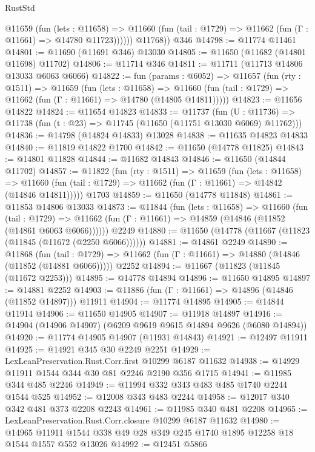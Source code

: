 \begin{lexlean}{RustStd}
\begin{coremodule}
            @11659
              (fun (lets : @11658) =>
              @11660 (fun (tail : @1729) => @11662 (fun (Γ : @11661) => @14780 @11723))))))
        @11768))
    @346
@14798 := @11774 @11461
@14801 := @11690 (@11691 @346) @13030
@14805 := @11650 (@11682 (@14801 @11698) @11702)
@14806 := @11714 @346
@14811 := @11711 (@11713 @14806 @13033 @6063 @6066)
@14822 := fun (params : @6052) =>
  @11657
    (fun (rty : @1511) =>
    @11659
      (fun (lets : @11658) =>
      @11660 (fun (tail : @1729) => @11662 (fun (Γ : @11661) => @14780 (@14805 @14811)))))
@14823 := @11656 @14822
@14824 := @11654 @14823
@14833 := @11737
    (fun (U : @11736) => @11738 (fun (t : @23) => @11745 (@11650 (@11751 @13030 @6069) @11762)))
@14836 := @14798 (@14824 @14833) @13028
@14838 := @11635 @14823 @14833
@14840 := @11819 @14822 @1700
@14842 := @11650 (@14778 @11825)
@14843 := @14801 @11828
@14844 := @11682 @14843
@14846 := @11650 (@14844 @11702)
@14857 := @11822
    (fun (rty : @1511) =>
    @11659
      (fun (lets : @11658) =>
      @11660 (fun (tail : @1729) => @11662 (fun (Γ : @11661) => @14842 (@14846 @14811)))))
    @1703
@14859 := @11650 (@14778 @11848)
@14861 := @11853 @14806 @13033
@14873 := @11844
    (fun (lets : @11658) =>
    @11660
      (fun (tail : @1729) =>
      @11662 (fun (Γ : @11661) => @14859 (@14846 (@11852 (@14861 @6063 @6066))))))
    @2249
@14880 := @11650 (@14778 (@11667 (@11823 (@11845 (@11672 (@2250 @6066))))))
@14881 := @14861 @2249
@14890 := @11868
    (fun (tail : @1729) => @11662 (fun (Γ : @11661) => @14880 (@14846 (@11852 (@14881 @6066)))))
    @2252
@14894 := @11667 (@11823 (@11845 (@11672 @2253)))
@14895 := @14778 @14894
@14896 := @11650 @14895
@14897 := @14881 @2252
@14903 := @11886 (fun (Γ : @11661) => @14896 (@14846 (@11852 @14897))) @11911
@14904 := @11774 @14895
@14905 := @14844 @11914
@14906 := @11650 @14905
@14907 := @11918 @14897
@14916 := @14904 (@14906 @14907) (@6209 @9619 @9615 @14894 @9626 (@6080 @14894))
@14920 := @11774 @14905 @14907 (@11931 @14843)
@14921 := @12497 @11911
@14925 := @14921 @345 @30 @2249 @2251
@14929 := LexLeanPreservation.Rust.Corr.first @10299 @6187 @11632
@14938 := @14929 @11911 @1544 @344 @30 @81 @2246 @2190 @356 @1715
@14941 := @11985 @344 @485 @2246
@14949 := @11994 @332 @343 @483 @485 @1740 @2244 @1544 @525
@14952 := @12008 @343 @483 @2244
@14958 := @12017 @340 @342 @481 @373 @2208 @2243
@14961 := @11985 @340 @481 @2208
@14965 := LexLeanPreservation.Rust.Corr.closure @10299 @6187 @11632
@14980 := @14965 @11911 @1544 @338 @49 @28 @349 @245 @1740 @1895 @12258 @18 @1544 @1557 @552 @13026
@14992 := @12451
    @5866

\end{coremodule}
\end{lexlean}
